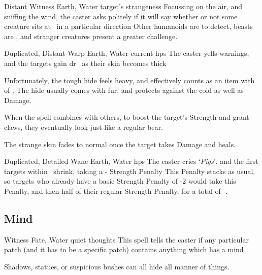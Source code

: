 \begin{multicols}{2}
{  

    {Distant}%
    {Witness}%
    {Earth, Water}%
    {target's strangeness}%
    {Focussing on the air, and sniffing the wind, the caster asks politely if it will say whether or not some creature sits at \spellRange\ in a particular direction}%
    {Other humanoids are \tn[7] to detect, beasts are \tn[9], and stranger creatures present a greater challenge.}


    {Duplicated, Distant}%
    {Warp}%
    {Earth, Water}%
    {current \glspl{hp}}%
    {The caster yells warnings, and the targets gain \gls{dr}~ as their skin becomes thick}%
    {Unfortunately, the tough hide feels heavy, and effectively counts as an item with  of .
    The hide usually comes with fur, and protects against the cold as well as Damage.

    When the spell combines with others, to boost the target's Strength and grant claws, they eventually look just like a regular bear.

    The strange skin fades to normal once the target takes Damage and heals.}

    {Duplicated, Detailed}%
    {Wane}%
    {Earth, Water}%
    {\glspl{hp}}%
    {The caster cries `\textit{Pigs}', and the first  targets within \spellRange\ shrink, taking a - Strength Penalty}%
    {
    This Penalty stacks as usual, so targets who already have a basic Strength Penalty of -2 would take this Penalty, and then half of their regular Strength Penalty, for a total of -.}

}{}

\subsection{Mind}
\label{mindSpells}



  {}%
  {Witness}%
  {Fate, Water}%
  {quiet thoughts}%
  {This spell tells the caster if any particular patch (and it has to be a specific patch) contains anything which has a mind}%
  {Shadows, statues, or suspicious bushes can all hide all manner of things.

}
\end{multicols}
